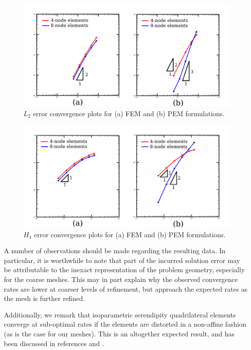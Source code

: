 \documentclass[12pt]{article}
\begin{document}
\begin{figure}[!h]
  \centering
  \includegraphics[width=1.0\textwidth]{l2_error_plot.png}
  \caption{$L_2$ error convergence plots for (a) FEM and (b) PEM formulations.}
  \label{fig:l2_error}
  \vspace{-10pt}
\end{figure}

\begin{figure}[!h]
  \centering
  \includegraphics[width=1.0\textwidth]{h1_error_plot.png}
  \caption{$H_1$ error convergence plots for (a) FEM and (b) PEM formulations.}
  \label{fig:h1_error}
\end{figure}

\newpage

A number of observations should be made regarding the resulting data. In particular, it is worthwhile to note that part of the incurred solution error may be attributable to the inexact representation of the problem geometry, especially for the coarse meshes. This may in part explain why the observed convergence rates are lower at coarser levels of refinement, but approach the expected rates as the mesh is further refined.

Additionally, we remark that isoparametric serendipity quadrilateral elements converge at sub-optimal rates if the elements are distorted in a non-affine fashion (as is the case for our meshes). This is an altogether expected result, and has been discussed in references \cite{serendipity_convergence_rates1} and \cite{serendipity_convergence_rates2}.
\end{document}
